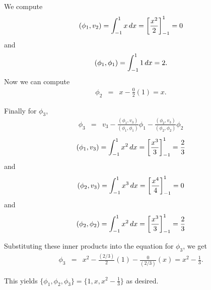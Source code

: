 \begin{solution}
\begin{enumerate}
We compute
\[
({ \phi}_1, { v}_2) = \int_{-1}^1 x \, dx = \left[\frac{x^2}{2}\right]_{-1}^{1}= 0
\]
and
\[
({ \phi}_1, {\phi }_1) = \int_{-1}^1 1 \, dx =  2.
\]
Now we can compute  
\begin{eqnarray*}
{ \phi}_2 &=& x - \frac{0}{2} (1) =x .
\end{eqnarray*}

Finally for $\phi_3$,
\begin{eqnarray*}
{ \phi}_3 &=& { v}_3-\frac{({ \phi}_1, { v}_3)}{({ \phi}_1, { \phi}_1)} { \phi}_1 - \frac{({ \phi}_2, { v}_3)}{({ \phi}_2, { \phi}_2)} { \phi}_2
\end{eqnarray*}
\[
( \phi_1,  v_3 ) = \int_{-1}^1 x^2 \, dx = \left[\frac{x^3}{3}\right]_{-1}^{1}= \frac{2}{3} 
\]
and 
\[
( \phi_2,  v_3 ) = \int_{-1}^1 x^3 \, dx = \left[\frac{x^4}{4}\right]_{-1}^{1}= 0 
\]
and
\[
( \phi_2,  \phi_2 ) = \int_{-1}^1 x^2 \, dx = \left[\frac{x^3}{3}\right]_{-1}^{1}= \frac{2}{3}  
\]

Substituting these inner products into the  equation for $\phi_3$, we get 
\begin{eqnarray*}
{ \phi}_3 &=& x^2-\frac{(2/3)}{2} (1)  - \frac{0}{(2/3)} (x) = x^2 -\frac{1}{3}.
\end{eqnarray*}

This yields $ \{{\phi}_1, {\phi}_2, { \phi}_3\} = \{1, x , x^2 -\frac{1}{3}\} $ as desired. 
\end{enumerate}
\end{solution}